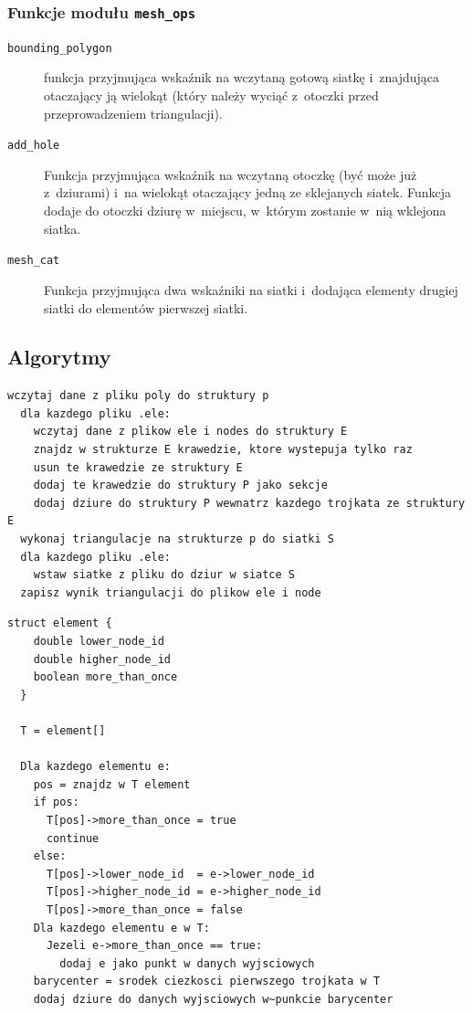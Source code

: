 \documentclass[a4paper]{article}
\begin{document}
\subsubsection{Funkcje modułu \texttt{mesh\_ops}}
\begin{description}
  \item[\texttt{bounding\_polygon}] funkcja przyjmująca wskaźnik na wczytaną gotową siatkę i~znajdująca otaczający ją wielokąt (który należy wyciąć z~otoczki przed przeprowadzeniem triangulacji).
  \item[\texttt{add\_hole}] Funkcja przyjmująca wskaźnik na wczytaną otoczkę (być może już z~dziurami) i~na wielokąt otaczający jedną ze sklejanych siatek. Funkcja dodaje do otoczki dziurę w~miejscu, w~którym zostanie w~nią wklejona siatka.
  \item[\texttt{mesh\_cat}] Funkcja przyjmująca dwa wskaźniki na siatki i~dodająca elementy drugiej siatki do elementów pierwszej siatki.
\end{description}

\subsection{Algorytmy}
\begin{lstlisting}[caption=Pseudokod algorytmu głównej funkcji programu sklejającej siatki]
  wczytaj dane z pliku poly do struktury p
  dla kazdego pliku .ele:
    wczytaj dane z plikow ele i nodes do struktury E
    znajdz w strukturze E krawedzie, ktore wystepuja tylko raz
    usun te krawedzie ze struktury E
    dodaj te krawedzie do struktury P jako sekcje
    dodaj dziure do struktury P wewnatrz kazdego trojkata ze struktury E
  wykonaj triangulacje na strukturze p do siatki S
  dla kazdego pliku .ele:
    wstaw siatke z pliku do dziur w siatce S
  zapisz wynik triangulacji do plikow ele i node
\end{lstlisting}

\begin{lstlisting}[caption=Pseudokod funkcji szukającej wielokąta otaczającego daną siatkę: \texttt{bounding\_polygon}]
  struct element {
    double lower_node_id
    double higher_node_id
    boolean more_than_once
  }

  T = element[]

  Dla kazdego elementu e:
    pos = znajdz w T element
    if pos:
      T[pos]->more_than_once = true
      continue
    else:
      T[pos]->lower_node_id  = e->lower_node_id
      T[pos]->higher_node_id = e->higher_node_id
      T[pos]->more_than_once = false
    Dla kazdego elementu e w T:
      Jezeli e->more_than_once == true:
        dodaj e jako punkt w danych wyjsciowych
    barycenter = srodek ciezkosci pierwszego trojkata w T
    dodaj dziure do danych wyjsciowych w~punkcie barycenter
\end{lstlisting}
\end{document}
